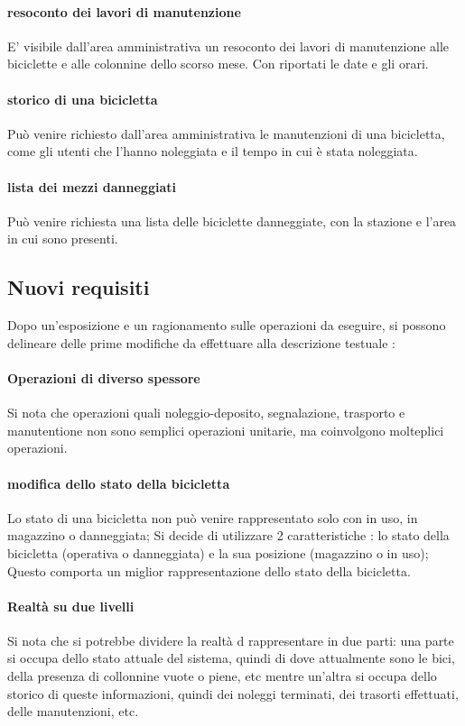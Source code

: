 \documentclass[a4paper,twoside]{article}
\begin{document}
\paragraph{resoconto dei lavori di manutenzione} E' visibile dall'area amministrativa un resoconto dei lavori di manutenzione alle biciclette e alle colonnine dello scorso mese. Con riportati le date e gli orari.
\paragraph{storico di una bicicletta} Può venire richiesto dall'area amministrativa le manutenzioni di una bicicletta, come gli utenti che l'hanno noleggiata e il tempo in cui è stata noleggiata.
\paragraph{lista dei mezzi danneggiati} Può venire richiesta una lista delle biciclette danneggiate, con la stazione e l'area in cui sono presenti.

\subsection{Nuovi requisiti}
Dopo un'esposizione e un ragionamento sulle operazioni da eseguire, si possono delineare delle prime modifiche da effettuare alla descrizione testuale :
\paragraph{Operazioni di diverso spessore} Si nota che operazioni quali noleggio-deposito, segnalazione, trasporto e manutentione non sono semplici operazioni unitarie, ma coinvolgono molteplici operazioni.
\paragraph{modifica dello stato della bicicletta} Lo stato di una bicicletta non può venire rappresentato solo con in uso, in magazzino o danneggiata; Si decide di utilizzare 2 caratteristiche : lo stato della bicicletta (operativa o danneggiata) e la sua posizione (magazzino o in uso); Questo comporta un miglior rappresentazione dello stato della bicicletta.
\paragraph{Realtà su due livelli} Si nota che si potrebbe dividere la realtà d rappresentare in due parti: una parte si occupa dello stato attuale del sistema, quindi di dove attualmente sono le bici, della presenza di collonnine vuote o piene, etc mentre un'altra si occupa dello storico di queste informazioni, quindi dei noleggi terminati, dei trasorti effettuati, delle manutenzioni, etc.
\end{document}
